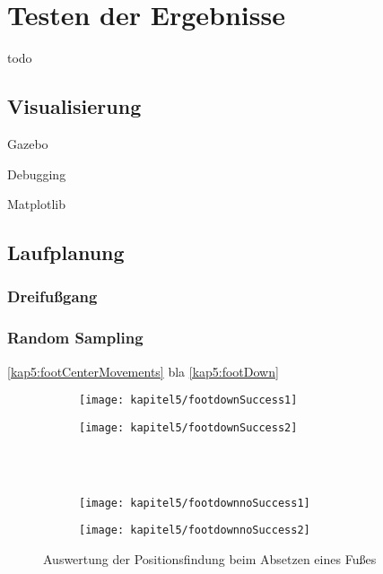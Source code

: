 \chapter{Testen der Ergebnisse}
\label{kap5}

todo

\section{Visualisierung}

Gazebo

Debugging

Matplotlib

\section{Laufplanung}

\subsection{Dreifußgang}

\subsection{Random Sampling}

\autoref{kap5:footCenterMovements} bla \autoref{kap5:footDown}

\begin{figure}[b!]
  \centering
  \begin{subfigure}[b]{.5\linewidth}
    \centering
    \texttt{[image: kapitel5/footdownSuccess1]}
    \label{kap5:footDownNormal2}
  \end{subfigure}%
  \begin{subfigure}[b]{.5\linewidth}
    \centering
    \texttt{[image: kapitel5/footdownSuccess2]}
    \label{kap5:footDownNormal2}
  \end{subfigure}\\
  \\[\smallskipamount]
  \begin{subfigure}[b]{.5\linewidth}
    \centering
    \texttt{[image: kapitel5/footdownnoSuccess1]}
    \label{kap5:footDownSpiral1}
  \end{subfigure}%
  \begin{subfigure}[b]{.5\linewidth}
    \centering
    \texttt{[image: kapitel5/footdownnoSuccess2]}
    \label{kap5:footDownSpiral2}
  \end{subfigure}%
  \caption{Auswertung der Positionsfindung beim Absetzen eines Fußes}
  \label{kap5:footDown}
\end{figure}

